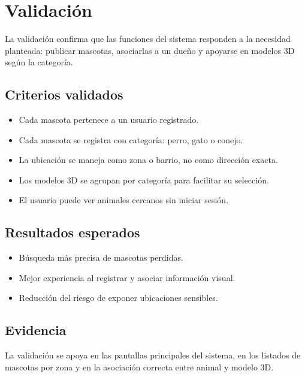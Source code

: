 \section{Validaci\'on}

La validaci\'on confirma que las funciones del sistema responden a la necesidad planteada: publicar mascotas, asociarlas a un due\~no y apoyarse en modelos 3D seg\'un la categor\'ia.

\subsection{Criterios validados}
\begin{itemize}[leftmargin=*]
    \item Cada mascota pertenece a un usuario registrado.
    \item Cada mascota se registra con categor\'ia: perro, gato o conejo.
    \item La ubicaci\'on se maneja como zona o barrio, no como direcci\'on exacta.
    \item Los modelos 3D se agrupan por categor\'ia para facilitar su selecci\'on.
    \item El usuario puede ver animales cercanos sin iniciar sesi\'on.
\end{itemize}

\subsection{Resultados esperados}
\begin{itemize}[leftmargin=*]
    \item B\'usqueda m\'as precisa de mascotas perdidas.
    \item Mejor experiencia al registrar y asociar informaci\'on visual.
    \item Reducci\'on del riesgo de exponer ubicaciones sensibles.
\end{itemize}

\subsection{Evidencia}
La validaci\'on se apoya en las pantallas principales del sistema, en los listados de mascotas por zona y en la asociaci\'on correcta entre animal y modelo 3D.
